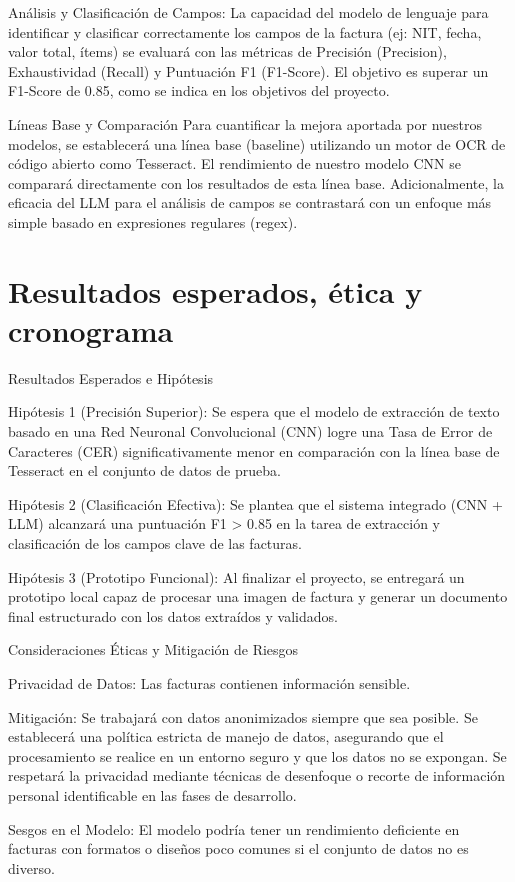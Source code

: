 \documentclass[11pt,letterpaper]{article}
\begin{document}
Análisis y Clasificación de Campos: La capacidad del modelo de lenguaje para identificar y clasificar correctamente los campos de la factura (ej: NIT, fecha, valor total, ítems) se evaluará con las métricas de Precisión (Precision), Exhaustividad (Recall) y Puntuación F1 (F1-Score). El objetivo es superar un F1-Score de 0.85, como se indica en los objetivos del proyecto.

Líneas Base y Comparación Para cuantificar la mejora aportada por nuestros modelos, se establecerá una línea base (baseline) utilizando un motor de OCR de código abierto como Tesseract. El rendimiento de nuestro modelo CNN se comparará directamente con los resultados de esta línea base. Adicionalmente, la eficacia del LLM para el análisis de campos se contrastará con un enfoque más simple basado en expresiones regulares (regex).

\section{Resultados esperados, ética y cronograma}
Resultados Esperados e Hipótesis

Hipótesis 1 (Precisión Superior): Se espera que el modelo de extracción de texto basado en una Red Neuronal Convolucional (CNN) logre una Tasa de Error de Caracteres (CER) significativamente menor en comparación con la línea base de Tesseract en el conjunto de datos de prueba.

Hipótesis 2 (Clasificación Efectiva): Se plantea que el sistema integrado (CNN + LLM) alcanzará una puntuación F1 > 0.85 en la tarea de extracción y clasificación de los campos clave de las facturas.

Hipótesis 3 (Prototipo Funcional): Al finalizar el proyecto, se entregará un prototipo local capaz de procesar una imagen de factura y generar un documento final estructurado con los datos extraídos y validados.

Consideraciones Éticas y Mitigación de Riesgos

Privacidad de Datos: Las facturas contienen información sensible.

Mitigación: Se trabajará con datos anonimizados siempre que sea posible. Se establecerá una política estricta de manejo de datos, asegurando que el procesamiento se realice en un entorno seguro y que los datos no se expongan. Se respetará la privacidad mediante técnicas de desenfoque o recorte de información personal identificable en las fases de desarrollo.

Sesgos en el Modelo: El modelo podría tener un rendimiento deficiente en facturas con formatos o diseños poco comunes si el conjunto de datos no es diverso.
\end{document}
